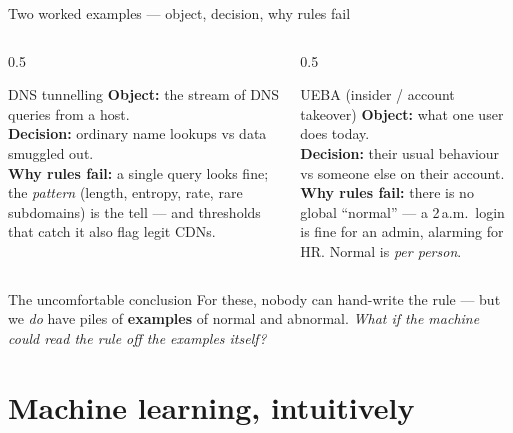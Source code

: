 \documentclass[aspectratio=169,10pt]{beamer}
\newcommand{\term}[1]{{\color{mlink}\textbf{#1}}}         %
\begin{document}
\begin{frame}{Two worked examples --- object, decision, why rules fail}
  \begin{columns}[T]
    \begin{column}{0.5\textwidth}
      \begin{exampleblock}{\small DNS tunnelling}
        \small
        \textbf{Object:} the stream of DNS queries from a host.\\
        \textbf{Decision:} ordinary name lookups vs data smuggled out.\\
        \textbf{Why rules fail:} a single query looks fine; the \emph{pattern}
        (length, entropy, rate, rare subdomains) is the tell --- and thresholds
        that catch it also flag legit CDNs.
      \end{exampleblock}
    \end{column}
    \begin{column}{0.5\textwidth}
      \begin{exampleblock}{\small UEBA (insider / account takeover)}
        \small
        \textbf{Object:} what one user does today.\\
        \textbf{Decision:} their usual behaviour vs someone else on their account.\\
        \textbf{Why rules fail:} there is no global ``normal'' --- a 2\,a.m.\
        login is fine for an admin, alarming for HR. Normal is \emph{per person}.
      \end{exampleblock}
    \end{column}
  \end{columns}
  \vfill
  \begin{block}{\small The uncomfortable conclusion}
    \small For these, nobody can hand-write the rule --- but we \emph{do} have
    piles of \term{examples} of normal and abnormal. \emph{What if the machine
    could read the rule off the examples itself?}
  \end{block}
\end{frame}


\section{Machine learning, intuitively}
\end{document}
